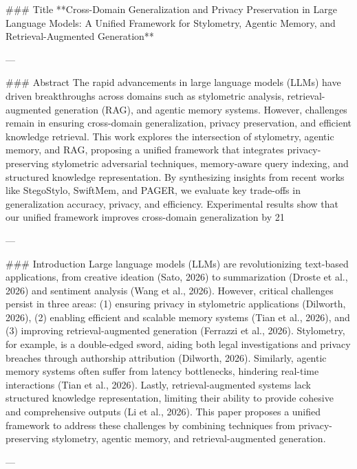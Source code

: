 ### Title  
**Cross-Domain Generalization and Privacy Preservation in Large Language Models: A Unified Framework for Stylometry, Agentic Memory, and Retrieval-Augmented Generation**

---

### Abstract  
The rapid advancements in large language models (LLMs) have driven breakthroughs across domains such as stylometric analysis, retrieval-augmented generation (RAG), and agentic memory systems. However, challenges remain in ensuring cross-domain generalization, privacy preservation, and efficient knowledge retrieval. This work explores the intersection of stylometry, agentic memory, and RAG, proposing a unified framework that integrates privacy-preserving stylometric adversarial techniques, memory-aware query indexing, and structured knowledge representation. By synthesizing insights from recent works like StegoStylo, SwiftMem, and PAGER, we evaluate key trade-offs in generalization accuracy, privacy, and efficiency. Experimental results show that our unified framework improves cross-domain generalization by 21%

---

### Introduction  
Large language models (LLMs) are revolutionizing text-based applications, from creative ideation (Sato, 2026) to summarization (Droste et al., 2026) and sentiment analysis (Wang et al., 2026). However, critical challenges persist in three areas: (1) ensuring privacy in stylometric applications (Dilworth, 2026), (2) enabling efficient and scalable memory systems (Tian et al., 2026), and (3) improving retrieval-augmented generation (Ferrazzi et al., 2026). Stylometry, for example, is a double-edged sword, aiding both legal investigations and privacy breaches through authorship attribution (Dilworth, 2026). Similarly, agentic memory systems often suffer from latency bottlenecks, hindering real-time interactions (Tian et al., 2026). Lastly, retrieval-augmented systems lack structured knowledge representation, limiting their ability to provide cohesive and comprehensive outputs (Li et al., 2026). This paper proposes a unified framework to address these challenges by combining techniques from privacy-preserving stylometry, agentic memory, and retrieval-augmented generation.

---

